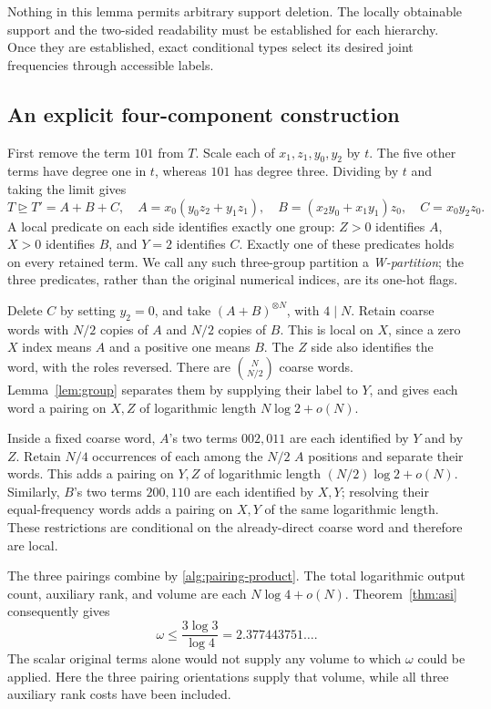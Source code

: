 \documentclass[11pt]{article}
\numberwithin{equation}{section}
\theoremstyle{definition}
\theoremstyle{remark}
\begin{document}
Nothing in this lemma permits arbitrary support deletion.  The locally
obtainable support and the two-sided readability must be established for
each hierarchy.  Once they are established, exact conditional types select
its desired joint frequencies through accessible labels.

\subsection{An explicit four-component construction}
\label{alg:four}

First remove the term \(101\) from \(T\).  Scale each of
\(x_1,z_1,y_0,y_2\) by \(t\).  The five other terms have degree one in
\(t\), whereas \(101\) has degree three.  Dividing by \(t\) and taking
the limit gives
\begin{equation}
 T\unrhd T'=A+B+C,
 \quad
 A=x_0(y_0z_2+y_1z_1),\quad
 B=(x_2y_0+x_1y_1)z_0,\quad
 C=x_0y_2z_0.
 \label{alg:five}
\end{equation}
A local predicate on each side identifies exactly one group:
\(Z>0\) identifies \(A\), \(X>0\) identifies \(B\), and \(Y=2\)
identifies \(C\).  Exactly one of these predicates holds on every retained
term.  We call any such three-group partition a \emph{W-partition}; the
three predicates, rather than the original numerical indices, are its
one-hot flags.

Delete \(C\) by setting \(y_2=0\), and take \((A+B)^{\otimes N}\),
with \(4\mid N\).  Retain coarse words with \(N/2\) copies of \(A\)
and \(N/2\) copies of \(B\).  This is local on \(X\), since a zero
\(X\) index means \(A\) and a positive one means \(B\).
The \(Z\) side also identifies the word, with the roles reversed.
There are \(\binom{N}{N/2}\) coarse words.  Lemma~\ref{lem:group}
separates them by supplying their label to \(Y\), and gives each word a
pairing on \(X,Z\) of logarithmic length \(N\log2+o(N)\).

Inside a fixed coarse word, \(A\)'s two terms \(002,011\) are each
identified by \(Y\) and by \(Z\).  Retain \(N/4\) occurrences of each
among the \(N/2\) \(A\) positions and separate their words.  This adds a
pairing on \(Y,Z\) of logarithmic length \((N/2)\log2+o(N)\).
Similarly, \(B\)'s two terms \(200,110\) are each identified by
\(X,Y\); resolving their equal-frequency words adds a pairing on
\(X,Y\) of the same logarithmic length.  These restrictions are
conditional on the already-direct coarse word and therefore are local.

The three pairings combine by \eqref{alg:pairing-product}.  The total
logarithmic output count, auxiliary rank, and volume are each
\(N\log4+o(N)\).  Theorem~\ref{thm:asi} consequently gives
\begin{equation}
 \omega\leq\frac{3\log3}{\log4}=2.377443751\ldots.
 \label{alg:four-bound}
\end{equation}
The scalar original terms alone would not supply any volume to which
\(\omega\) could be applied.  Here the three pairing orientations supply
that volume, while all three auxiliary rank costs have been included.
\end{document}
